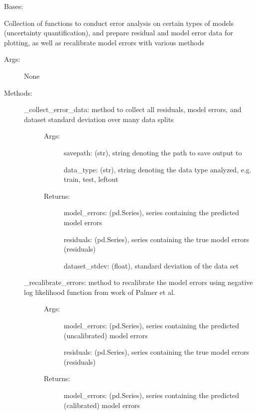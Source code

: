 \documentclass[letterpaper,10pt,english]{sphinxmanual}
\begin{document}
\begin{fulllineitems}
\label{\detokenize{api/mastml.error_analysis.ErrorUtils:mastml.error_analysis.ErrorUtils}}
Bases: 

Collection of functions to conduct error analysis on certain types of models (uncertainty quantification), and prepare
residual and model error data for plotting, as well as recalibrate model errors with various methods
\begin{description}
\item[{Args:}] \leavevmode
None

\item[{Methods:}] \leavevmode\begin{description}
\item[{\_collect\_error\_data: method to collect all residuals, model errors, and dataset standard deviation over many data splits}] \leavevmode\begin{description}
\item[{Args:}] \leavevmode
savepath: (str), string denoting the path to save output to

data\_type: (str), string denoting the data type analyzed, e.g. train, test, leftout

\item[{Returns:}] \leavevmode
model\_errors: (pd.Series), series containing the predicted model errors

residuals: (pd.Series), series containing the true model errors (residuals)

dataset\_stdev: (float), standard deviation of the data set

\end{description}

\item[{\_recalibrate\_errors: method to recalibrate the model errors using negative log likelihood function from work of Palmer et al.}] \leavevmode\begin{description}
\item[{Args:}] \leavevmode
model\_errors: (pd.Series), series containing the predicted (uncalibrated) model errors

residuals: (pd.Series), series containing the true model errors (residuals)

\item[{Returns:}] \leavevmode
model\_errors: (pd.Series), series containing the predicted (calibrated) model errors


\end{description}
\end{description}
\end{description}
\end{fulllineitems}
\end{document}
